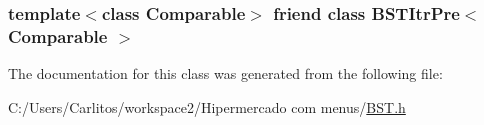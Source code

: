 \label{class_b_s_t_a5dc153694be266f6e772659486219da7}
\hypertarget{class_b_s_t_a45a55df6f11541416d4ea7684c575c1a}{
\subsubsection[{BSTItrPre$<$ Comparable $>$}]{\setlength{\rightskip}{0pt plus 5cm}template$<$class Comparable$>$ friend class {\bf BSTItrPre}$<$ Comparable $>$}}
\label{class_b_s_t_a45a55df6f11541416d4ea7684c575c1a}


The documentation for this class was generated from the following file:\begin{DoxyCompactItemize}
\item 
C:/Users/Carlitos/workspace2/Hipermercado com menus/\hyperlink{_b_s_t_8h}{BST.h}\end{DoxyCompactItemize}
